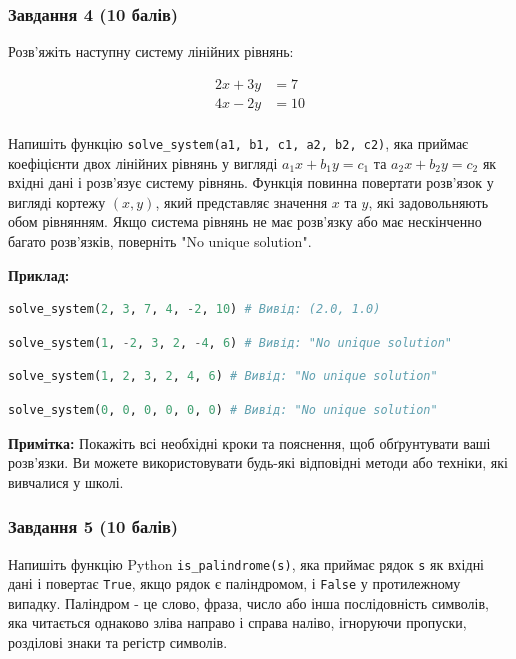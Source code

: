 \documentclass[12pt]{article}
\begin{document}
\subsubsection{Завдання 4 (10 балів)}

Розв'яжіть наступну систему лінійних рівнянь:

\[
\begin{align*}
2x + 3y &= 7 \\
4x - 2y &= 10 \\
\end{align*}
\]

Напишіть функцію \texttt{solve\_system(a1, b1, c1, a2, b2, c2)}, яка приймає коефіцієнти двох лінійних рівнянь у вигляді $a_1x + b_1y = c_1$ та $a_2x + b_2y = c_2$ як вхідні дані і розв'язує систему рівнянь. Функція повинна повертати розв'язок у вигляді кортежу $(x, y)$, який представляє значення $x$ та $y$, які задовольняють обом рівнянням. Якщо система рівнянь не має розв'язку або має нескінченно багато розв'язків, поверніть "No unique solution".

\textbf{Приклад:}
\begin{lstlisting}[language=Python]
solve_system(2, 3, 7, 4, -2, 10) # Вивід: (2.0, 1.0)
\end{lstlisting}

\begin{lstlisting}[language=Python]
solve_system(1, -2, 3, 2, -4, 6) # Вивід: "No unique solution"
\end{lstlisting}

\begin{lstlisting}[language=Python]
solve_system(1, 2, 3, 2, 4, 6) # Вивід: "No unique solution"
\end{lstlisting}

\begin{lstlisting}[language=Python]
solve_system(0, 0, 0, 0, 0, 0) # Вивід: "No unique solution"
\end{lstlisting}

\textbf{Примітка:} Покажіть всі необхідні кроки та пояснення, щоб обґрунтувати ваші розв'язки. Ви можете використовувати будь-які відповідні методи або техніки, які вивчалися у школі.

\subsubsection{Завдання 5 (10 балів)}
Напишіть функцію Python \texttt{is_palindrome(s)}, яка приймає рядок \texttt{s} як вхідні дані і повертає \texttt{True}, якщо рядок є паліндромом, і \texttt{False} у протилежному випадку. Паліндром - це слово, фраза, число або інша послідовність символів, яка читається однаково зліва направо і справа наліво, ігноруючи пропуски, розділові знаки та регістр символів.
\end{document}
